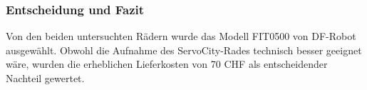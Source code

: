 \documentclass[main.tex]{subfiles} %
\begin{document}
\subsubsection*{Entscheidung und Fazit}
Von den beiden untersuchten Rädern wurde das Modell FIT0500 von DF-Robot ausgewählt.
Obwohl die Aufnahme des ServoCity-Rades technisch besser geeignet wäre, wurden die
erheblichen Lieferkosten von 70 CHF als entscheidender Nachteil gewertet.
\end{document}
